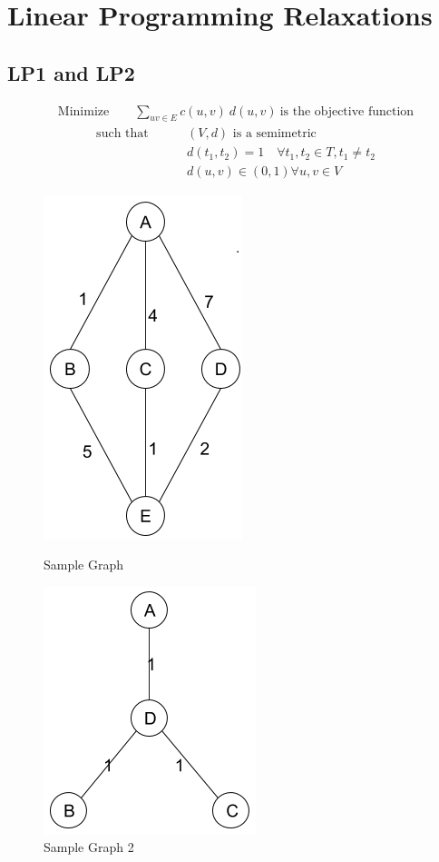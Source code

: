 \documentclass[11pt]{article}
\begin{document}
\section{Linear Programming  Relaxations}
\subsection{LP1 and LP2}
\begin{align*}
\text{Minimize} \qquad  \sum\limits_{uv \in E}{c(u, v) \ d(u, v)} \ \text{is the objective function}
\end{align*}
\vspace{-20pt}
\begin{align}    
\text{such that} \ \qquad & (V,d) \text{ is a semimetric}\\
&d(t_1, t_2) = 1 \quad \forall t_1, t_2 \in T, t_1 \neq t_2\\
&d(u, v) \in (0,1) \forall u, v \in V
\end{align}
\begin{figure}
\centering
\includegraphics[scale = 0.5]{graph}
\caption{Sample Graph}
\label{fig:sample_graph}
\centering
\includegraphics[scale = 0.4]{graph2}
\caption{Sample Graph 2}
\label{fig:sample_graph_2}
\end{figure}
\end{document}
